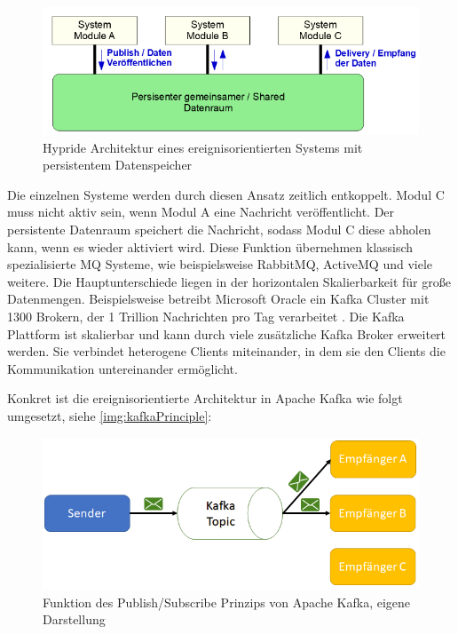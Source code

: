 \documentclass[a4paper,titlepage,halfparskip,12pt]{scrreprt}
\begin{document}
\begin{onehalfspacing}
\begin{figure}[h]
	\centering
	\includegraphics[width=.8\textwidth]{images/PublishSubscribeTanenbaum}
	\caption{Hypride Architektur eines ereignisorientierten Systems mit persistentem Datenspeicher \cite{richterArchitekturVS}}
	\label{img:PublishSubscribeTanenbaum}
\end{figure}

Die einzelnen Systeme werden durch diesen Ansatz zeitlich entkoppelt. Modul C muss nicht aktiv sein, wenn Modul A eine Nachricht veröffentlicht. Der persistente Datenraum speichert die Nachricht, sodass Modul C diese abholen kann, wenn es wieder aktiviert wird. Diese Funktion übernehmen klassisch spezialisierte \ac{MQ} Systeme, wie beispielsweise RabbitMQ, ActiveMQ und viele weitere. Die Hauptunterschiede liegen in der horizontalen Skalierbarkeit für große Datenmengen. Beispielsweise betreibt Microsoft Oracle ein Kafka Cluster mit 1300 Brokern, der 1 Trillion Nachrichten pro Tag verarbeitet \cite{ritchieKafkaMicrosoft}. Die Kafka Plattform ist skalierbar und kann durch viele zusätzliche Kafka Broker erweitert werden. Sie verbindet heterogene Clients miteinander, in dem sie den Clients die Kommunikation untereinander ermöglicht.

\pagebreak

Konkret ist die ereignisorientierte Architektur in Apache Kafka wie folgt umgesetzt, siehe \autoref{img:kafkaPrinciple}:

\begin{figure}[h]
	\centering
	\includegraphics[width=.8\textwidth]{images/principleKafka}
	\caption{Funktion des Publish/Subscribe Prinzips von Apache Kafka, eigene Darstellung}
	\label{img:kafkaPrinciple}
\end{figure}


\end{onehalfspacing}
\end{document}
